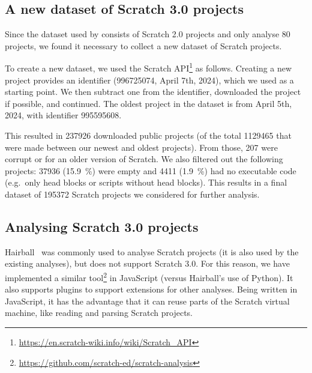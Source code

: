 \documentclass[../main]{subfiles}
\begin{document}
\subsection{A new dataset of Scratch 3.0 projects}\label{subsec:a-new-dataset-of-scratch-projects}

Since the dataset used by \textcite{aivaloglouHowKidsCode2016} consists of Scratch 2.0 projects and \textcite{fronzaApproachEvaluateComplexity2020} only analyse 80 projects, we found it necessary to collect a new dataset of Scratch projects.

To create a new dataset, we used the Scratch API\footnote{\url{https://en.scratch-wiki.info/wiki/Scratch_API}} as follows.
Creating a new project provides an identifier ({996725074}, April 7th, 2024), which we used as a starting point.
We then subtract one from the identifier, downloaded the project if possible, and continued.
The oldest project in the dataset is from April 5th, 2024, with identifier {995595608}.

This resulted in \num{237926} downloaded public projects (of the total \num{1129465} that were made between our newest and oldest projects).
From those, \num{207} were corrupt or for an older version of Scratch.
We also filtered out the following projects: \num{37936} (\qty{15.9}{\percent}) were empty and \num{4411} (\qty{1.9}{\percent}) had no executable code (e.g.\ only head blocks or scripts without head blocks).
This results in a final dataset of \num{195372} Scratch projects we considered for further analysis.

\subsection{Analysing Scratch 3.0 projects}\label{subsec:analysing-scratch-3.0-projects}

Hairball~\autocite{boeHairballLintinspiredStatic2013} was commonly used to analyse Scratch projects (it is also used by the existing analyses), but does not support Scratch 3.0.
For this reason, we have implemented a similar tool\footnote{\url{https://github.com/scratch-ed/scratch-analysis}} in JavaScript (versus Hairball's use of Python).
It also supports plugins to support extensions for other analyses.
Being written in JavaScript, it has the advantage that it can reuse parts of the Scratch virtual machine, like reading and parsing Scratch projects.
\end{document}
